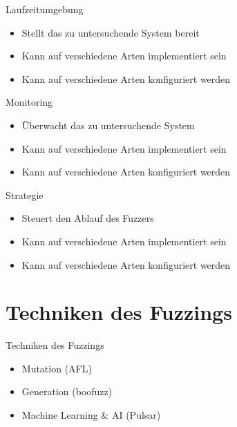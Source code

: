 \begin{frame}{Laufzeitumgebung}
    \begin{itemize}
        \item Stellt das zu untersuchende System bereit
        \item Kann auf verschiedene Arten implementiert sein
        \item Kann auf verschiedene Arten konfiguriert werden
    \end{itemize}
\end{frame}
\begin{frame}{Monitoring}
    \begin{itemize}
        \item Überwacht das zu untersuchende System
        \item Kann auf verschiedene Arten implementiert sein
        \item Kann auf verschiedene Arten konfiguriert werden
    \end{itemize}
\end{frame}
\begin{frame}{Strategie}
    \begin{itemize}
        \item Steuert den Ablauf des Fuzzers
        \item Kann auf verschiedene Arten implementiert sein
        \item Kann auf verschiedene Arten konfiguriert werden
    \end{itemize}
\end{frame}

\section{Techniken des Fuzzings}\label{sec:techniken-des-fuzzings}
\begin{frame}{Techniken des Fuzzings}
    \begin{itemize}
        \item Mutation (AFL)
        \item Generation (boofuzz)
        \item \alert{Machine Learning \& AI} (Pulsar)
    \end{itemize}
\end{frame}
